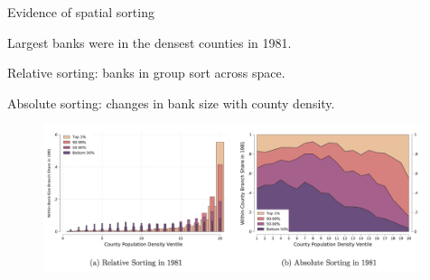 \documentclass[notes,10pt, aspectratio=169]{beamer}
\newenvironment{wideitemize}{\itemize\addtolength{\itemsep}{10pt}}{\enditemize}
\begin{document}
\begin{frame}{Evidence of spatial sorting}


            \begin{wideitemize}
                \item Largest banks were in the densest counties in 1981.
                \item Relative sorting: banks in group sort across space.
                \item Absolute sorting: changes in bank size with county density.
        \end{wideitemize}

    \begin{figure}
        \centering
        \includegraphics[width=0.99\textwidth]{imgs/fig7.png}
        \label{fig:my_label}
    \end{figure}
    
    \end{frame}
\end{document}

